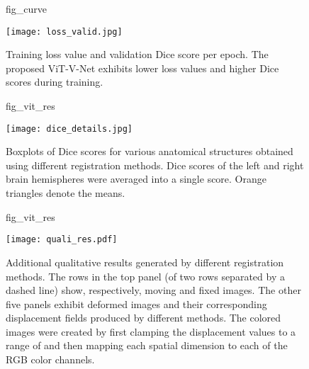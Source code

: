 \documentclass{midl}
\begin{document}
\newpage
\begin{figure}[!htp]
\floatconts
{fig_curve}
  {\caption{Training loss value and validation Dice score per epoch. The proposed ViT-V-Net exhibits lower loss values and higher Dice scores during training.}}
  {\texttt{[image: loss\_valid.jpg]}}
\end{figure}

\begin{figure}[!hbp]
\floatconts
{fig_vit_res}
  {\caption{Boxplots of Dice scores for various anatomical structures obtained using different registration methods. Dice scores of the left and right brain hemispheres were averaged into a single score. Orange triangles denote the means.}}
  {\texttt{[image: dice\_details.jpg]}}
\end{figure}
\newpage
\vspace{-4mm}
\begin{figure}[!htp]
\floatconts
{fig_vit_res}
  {\vspace{-4mm}\caption{Additional qualitative results generated by different registration methods. The rows in the top panel (of two rows separated by a dashed line) show, respectively, moving and fixed images. The other five panels exhibit deformed images and their corresponding displacement fields produced by different methods. The colored images were created by first clamping the displacement values to a range of  and then mapping each spatial dimension to each of the RGB color channels.}}
  {\texttt{[image: quali\_res.pdf]}}
  
\end{figure}



\let\cleardoublepage\clearpage
\end{document}
